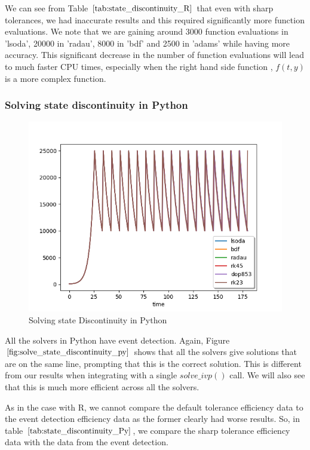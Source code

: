 We can see from Table $\ref{tab:state_discontinuity_R}$ that even with sharp tolerances, we had inaccurate results and this required significantly more function evaluations. We note that we are gaining around 3000 function evaluations in 'lsoda', 20000 in 'radau', 8000 in 'bdf' and 2500 in 'adams' while having more accuracy. This significant decrease in the number of function evaluations will lead to much faster CPU times, especially when the right hand side function , $f(t, y)$ is a more complex function.

\subsubsection{Solving state discontinuity in Python}
\begin{figure}[h]
	\centering
	\includegraphics[width=0.7\linewidth]{./figures/solve_state_discontinuity_py}
	\caption{Solving state Discontinuity in Python}
	\label{fig:solve_state_discontinuity_py}
\end{figure}
All the solvers in Python have event detection. Again, Figure $\ref{fig:solve_state_discontinuity_py}$ shows that all the solvers give solutions that are on the same line, prompting that this is the correct solution. This is different from our results when integrating with a single $solve\_ivp()$ call. We will also see that this is much more efficient across all the solvers.

As in the case with R, we cannot compare the default tolerance efficiency data to the event detection efficiency data as the former clearly had worse results. So, in table $\ref{tab:state_discontinuity_Py}$, we compare the sharp tolerance efficiency data with the data from the event detection.

